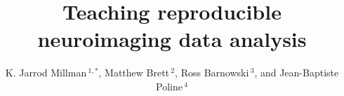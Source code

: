 \documentclass[utf8]{frontiersSCNS} %
\def\firstAuthorLast{Millman {et~al.}} %
\def\Authors{K. Jarrod Millman\,$^{1,*}$,
Matthew Brett\,$^{2}$,
Ross Barnowski\,$^{3}$,
and Jean-Baptiste Poline\,$^{4}$}
\begin{document}
\onecolumn
{}

\title[Teaching reproducible neuroimaging data analysis]{Teaching reproducible neuroimaging data analysis} 

\author[\firstAuthorLast ]{\Authors} %
\address{} %
\correspondance{} %

\extraAuth{}%




\end{document}
